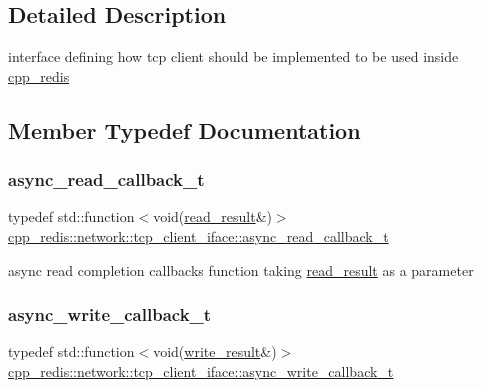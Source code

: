 \subsection{Detailed Description}
interface defining how tcp client should be implemented to be used inside \hyperlink{namespacecpp__redis}{cpp\+\_\+redis} 

\subsection{Member Typedef Documentation}
\mbox{\label{classcpp__redis_1_1network_1_1tcp__client__iface_ae8bf79e8e1f1d7e359ed1c7cdc4026fc}} 
\subsubsection{\texorpdfstring{async\+\_\+read\+\_\+callback\+\_\+t}{async\_read\_callback\_t}}
{\footnotesize\ttfamily typedef std\+::function$<$void(\hyperlink{structcpp__redis_1_1network_1_1tcp__client__iface_1_1read__result}{read\+\_\+result}\&)$>$ \hyperlink{classcpp__redis_1_1network_1_1tcp__client__iface_ae8bf79e8e1f1d7e359ed1c7cdc4026fc}{cpp\+\_\+redis\+::network\+::tcp\+\_\+client\+\_\+iface\+::async\+\_\+read\+\_\+callback\+\_\+t}}

async read completion callbacks function taking \hyperlink{structcpp__redis_1_1network_1_1tcp__client__iface_1_1read__result}{read\+\_\+result} as a parameter \mbox{\label{classcpp__redis_1_1network_1_1tcp__client__iface_a1dc52ccc70cf377c4fbb495a16adc658}} 
\subsubsection{\texorpdfstring{async\+\_\+write\+\_\+callback\+\_\+t}{async\_write\_callback\_t}}
{\footnotesize\ttfamily typedef std\+::function$<$void(\hyperlink{structcpp__redis_1_1network_1_1tcp__client__iface_1_1write__result}{write\+\_\+result}\&)$>$ \hyperlink{classcpp__redis_1_1network_1_1tcp__client__iface_a1dc52ccc70cf377c4fbb495a16adc658}{cpp\+\_\+redis\+::network\+::tcp\+\_\+client\+\_\+iface\+::async\+\_\+write\+\_\+callback\+\_\+t}}

